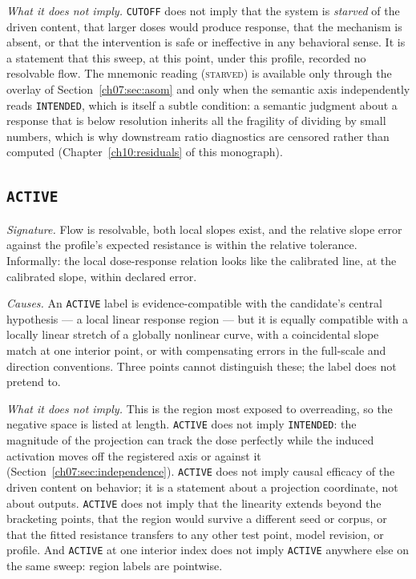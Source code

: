\emph{What it does not imply.} \texttt{CUTOFF} does not imply that the
system is \emph{starved} of the driven content, that larger doses would
produce response, that the mechanism is absent, or that the intervention is
safe or ineffective in any behavioral sense. It is a statement that this
sweep, at this point, under this profile, recorded no resolvable flow. The
mnemonic reading (\textsc{starved}) is available only through the overlay of
Section~\ref{ch07:sec:asom} and only when the semantic axis independently
reads \texttt{INTENDED}, which is itself a subtle condition: a semantic
judgment about a response that is below resolution inherits all the fragility
of dividing by small numbers, which is why downstream ratio diagnostics are
censored rather than computed (Chapter~\ref{ch10:residuals} of this
monograph).

\subsection{\texttt{ACTIVE}}\label{ch07:sec:region-active}

\emph{Signature.} Flow is resolvable, both local slopes exist, and the
relative slope error against the profile's expected resistance is within the
relative tolerance. Informally: the local dose-response relation looks like
the calibrated line, at the calibrated slope, within declared error.

\emph{Causes.} An \texttt{ACTIVE} label is evidence-compatible with the
candidate's central hypothesis --- a local linear response region --- but it
is equally compatible with a locally linear stretch of a globally nonlinear
curve, with a coincidental slope match at one interior point, or with
compensating errors in the full-scale and direction conventions. Three
points cannot distinguish these; the label does not pretend to.

\emph{What it does not imply.} This is the region most exposed to
overreading, so the negative space is listed at length. \texttt{ACTIVE} does
not imply \texttt{INTENDED}: the magnitude of the projection can track the
dose perfectly while the induced activation moves off the registered axis or
against it (Section~\ref{ch07:sec:independence}). \texttt{ACTIVE} does not
imply causal efficacy of the driven content on behavior; it is a statement
about a projection coordinate, not about outputs. \texttt{ACTIVE} does not
imply that the linearity extends beyond the bracketing points, that the
region would survive a different seed or corpus, or that the fitted
resistance transfers to any other test point, model revision, or profile.
And \texttt{ACTIVE} at one interior index does not imply \texttt{ACTIVE}
anywhere else on the same sweep: region labels are pointwise.

